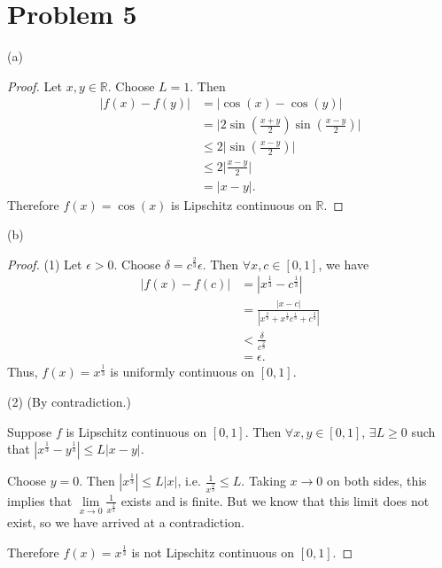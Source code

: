 \documentclass{article}
\newcommand{\R}{\mathbb{R}} %
\begin{document}
\section*{Problem 5}
(a) \begin{proof}
	Let $x, y \in \R$. Choose $L = 1$. Then
	\begin{align}
		|f(x) - f(y)| &= |\cos(x) - \cos(y)| \\
		&= \Big|2 \sin\left(\frac{x + y}{2}\right) \sin\left(\frac{x - y}{2}\right)\Big| \\
		& \leq 2 \Big|\sin\left(\frac{x - y}{2}\right)\Big| \\
		& \leq 2 \Big|\frac{x - y}{2}\Big| \\
		&= |x - y|.
	\end{align}
	Therefore $f(x) = \cos(x)$ is Lipschitz continuous on $\R$.
\end{proof}

(b) \begin{proof}
	(1) Let $\epsilon > 0$. Choose $\delta = c^{\frac{2}{3}} \epsilon$. Then $\forall x, c \in [0, 1]$, we have
	\begin{align}
		|f(x) - f(c)| &= |x^{\frac{1}{3}} - c^{\frac{1}{3}}| \\
		&= \frac{|x - c|}{|x^{\frac{2}{3}} + x^{\frac{1}{3}}c^{\frac{1}{3}} + c^{\frac{2}{3}}|} \\
		&< \frac{\delta}{c^{\frac{2}{3}}} \\
		&= \epsilon.
	\end{align}
	Thus, $f(x) = x^{\frac{1}{3}}$ is uniformly continuous on $[0, 1]$.
	
	(2) (By contradiction.)
	
	Suppose $f$ is Lipschitz continuous on $[0, 1]$. Then $\forall x, y \in [0, 1]$, $\exists L \geq 0$ such that $|x^{\frac{1}{3}} - y^{\frac{1}{3}}| \leq L |x - y|$.
	
	Choose $y = 0$. Then $|x^{\frac{1}{3}}| \leq L |x|$, i.e. $\frac{1}{x^{\frac{2}{3}}} \leq L$. Taking $x \to 0$ on both sides, this implies that $\lim\limits_{x \to 0} \frac{1}{x^{\frac{2}{3}}}$ exists and is finite. But we know that this limit does not exist, so we have arrived at a contradiction.
	
	Therefore $f(x) = x^{\frac{1}{3}}$ is not Lipschitz continuous on $[0, 1]$.
\end{proof}
\end{document}
